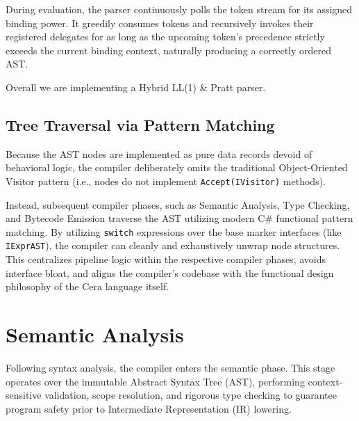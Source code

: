 \documentclass[11pt, a4paper]{article}
\begin{document}
During evaluation, the parser continuously polls the token stream for its assigned binding power. It greedily consumes tokens and recursively invokes their registered delegates for as long as the upcoming token's precedence strictly exceeds the current binding context, naturally producing a correctly ordered AST.

Overall we are implementing a Hybrid LL(1) \& Pratt parser.

\subsection{Tree Traversal via Pattern Matching}

Because the AST nodes are implemented as pure data records devoid of behavioral logic, the compiler deliberately omits the traditional Object-Oriented Visitor pattern (i.e., nodes do not implement \texttt{Accept(IVisitor)} methods). 

Instead, subsequent compiler phases, such as Semantic Analysis, Type Checking, and Bytecode Emission traverse the AST utilizing modern C\# functional pattern matching. By utilizing \texttt{switch} expressions over the base marker interfaces (like \texttt{IExprAST}), the compiler can cleanly and exhaustively unwrap node structures. This centralizes pipeline logic within the respective compiler phases, avoids interface bloat, and aligns the compiler's codebase with the functional design philosophy of the Cera language itself.

\section{Semantic Analysis}
\noindent
Following syntax analysis, the compiler enters the semantic phase. This stage operates over the immutable Abstract Syntax Tree (AST), performing context-sensitive validation, scope resolution, and rigorous type checking to guarantee program safety prior to Intermediate Representation (IR) lowering.
\end{document}
